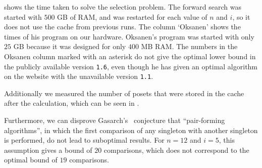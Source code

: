 \documentclass[twoside,leqno,twocolumn]{article}
\begin{document}
 shows the time taken to solve the selection problem.
The forward search was started with $500$ GB of RAM, and was restarted for each value of $n$ and $i$, so it does not use the cache from previous runs.
The column `Oksanen' shows the times of his program \cite{Oksanen} on our hardware.
Oksanen's program was started with only $25$ GB because it was designed for only $400$ MB RAM.
The numbers in the Oksanen column marked with an asterisk do not give the optimal lower bound in the publicly available version \texttt{1.6}, even though he has given an optimal algorithm on the website with the unavailable version \texttt{1.1}.

Additionally we measured the number of posets that were stored in the cache after the calculation, which can be seen in .

Furthermore, we can disprove Gasarch's~\cite{Gasarch1996} conjecture that ``pair-forming algorithms'', in which the first comparison of any singleton with another singleton is performed, do not lead to suboptimal results.
For $n = 12$ and $i = 5$, this assumption gives a bound of $20$ comparisons, which does not correspond to the optimal bound of $19$ comparisons.
\end{document}
